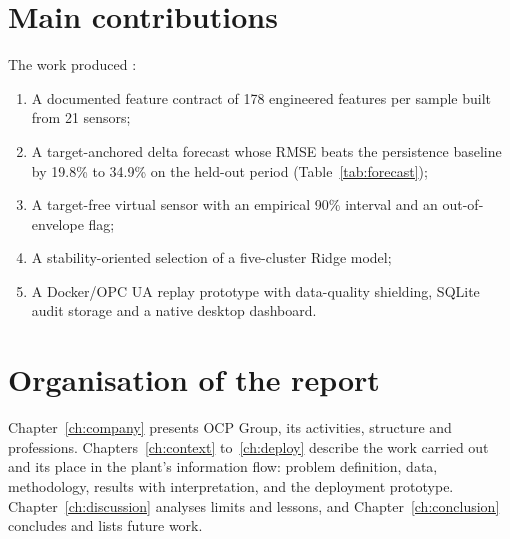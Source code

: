 \section{Main contributions}
The work produced :
\begin{enumerate}
  \item A documented feature contract of 178 engineered features per sample built from 21 sensors; 
  \item A target-anchored delta forecast whose RMSE beats the persistence baseline by 19.8\% to 34.9\% on the held-out period (Table~\ref{tab:forecast}); 
  \item A target-free virtual sensor with an empirical 90\% interval and an out-of-envelope flag; 
  \item A stability-oriented selection of a five-cluster Ridge model; 
  \item A Docker/OPC UA replay prototype with data-quality shielding, SQLite audit storage and a native desktop dashboard.
\end{enumerate}


\section{Organisation of the report}
Chapter~\ref{ch:company} presents OCP Group, its activities, structure and professions. Chapters~\ref{ch:context} to~\ref{ch:deploy} describe the work carried out and its place in the plant's information flow: problem definition, data, methodology, results with interpretation, and the deployment prototype. Chapter~\ref{ch:discussion} analyses limits and lessons, and Chapter~\ref{ch:conclusion} concludes and lists future work.
